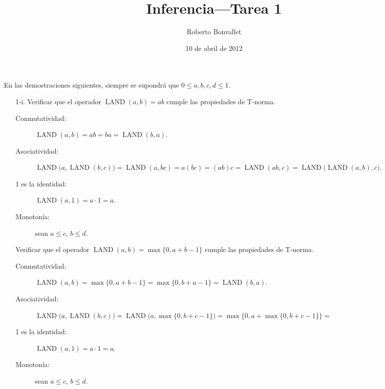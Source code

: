 \documentclass{article}
\title{Inferencia---Tarea 1}
\author{Roberto Bonvallet}
\date{10 de abril de 2012}
\DeclareMathOperator{\LAND}{LAND}
\DeclareMathOperator{\PAND}{LAND}
\begin{document}
\maketitle

En las demostraciones siguientes,
siempre se supondrá que
\(0\le a, b, c, d\le 1\).

\begin{enumerate}[
  label=\arabic*.,
  font=\LARGE\bfseries,%
  labelindent=-.5in,%
  leftmargin=0pt,%
  labelsep=1em%
]

  \item[1-i.]
    Verificar que el operador \(\PAND(a, b) = ab\)
    cumple las propiedades de T-norma.
    \begin{description}
      \item[Conmutatividad:]
        \(
          \PAND(a, b) =
          ab =
          ba =
          \PAND(b, a).
        \)
      \item[Asociatividad:]
        \(
          \PAND\bigl(a, \PAND(b, c)\bigr) =
          \PAND(a, bc) =
          a(bc) =
          (ab)c =
          \PAND(ab, c) =
          \PAND\bigl(\PAND(a, b), c\bigr).
        \)
      \item[1 es la identidad:]
        \(
          \PAND(a, 1) = a\cdot 1 = a.
        \)
      \item[Monotonía:] sean \(a\le c\), \(b\le d\).

    \end{description}

    Verificar que el operador \(\LAND(a, b) = \max\{0, a + b - 1\}\)
    cumple las propiedades de T-norma.
    \begin{description}
      \item[Conmutatividad:]
        \(
          \LAND(a, b) =
          \max\{0, a + b - 1\} =
          \max\{0, b + a - 1\} =
          \LAND(b, a).
        \)
      \item[Asociatividad:]
        \(
          \LAND\bigl(a, \LAND(b, c)\bigr) =
          \LAND\bigl(a, \max\{0, b + c - 1\}\bigr) =
          \max\bigl\{0, a + \max\{0, b + c - 1\}\bigl\} =
        \)
      \item[1 es la identidad:]
        \(
          \PAND(a, 1) = a\cdot 1 = a.
        \)
      \item[Monotonía:] sean \(a\le c\), \(b\le d\).

    \end{description}


\end{enumerate}
\end{document}
